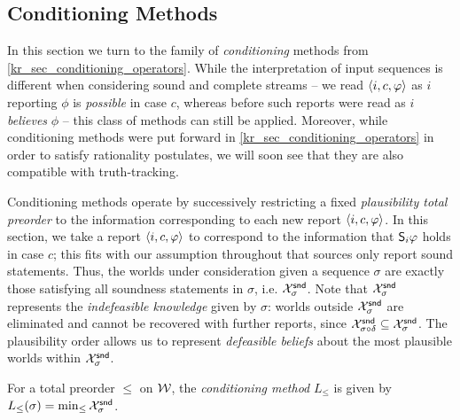 \subsection{Conditioning Methods}
\label{tt_sec_conditioning_methods}

In this section we turn to the family of \emph{conditioning} methods from
\cref{kr_sec_conditioning_operators}.
While the interpretation of input sequences is different when considering sound
and complete streams -- we
read $\tuple{i, c, \phi}$ as $i$ reporting $\phi$ is \emph{possible} in case
$c$, whereas before such reports were read as $i$
\emph{believes} $\phi$ -- this class of methods can still be applied.
Moreover, while conditioning methods were put forward in
\cref{kr_sec_conditioning_operators} in order to satisfy rationality
postulates, we will soon see that they are also compatible with truth-tracking.

Conditioning methods operate by successively restricting a fixed
\emph{plausibility total preorder} to the information corresponding to each
new report $\tuple{i, c, \phi}$. In this section, we take a report $\tuple{i, c,
\phi}$ to correspond to the information that $\S_i\phi$ holds in case $c$; this
fits with our assumption throughout that sources only report sound
statements.\footnotemark{}
%
Thus, the worlds under
consideration given a sequence $\sigma$ are exactly those satisfying all
soundness statements in $\sigma$, i.e. $\Xsnd_\sigma$. Note that $\Xsnd_\sigma$
represents the \emph{indefeasible knowledge} given by $\sigma$: worlds outside
$\Xsnd_\sigma$ are eliminated and cannot be recovered with further reports,
since $\Xsnd_{\sigma \seqappend \delta} \subseteq \Xsnd_\sigma$. The
plausibility order allows us to represent \emph{defeasible beliefs} about the
most plausible worlds within $\Xsnd_\sigma$.


\begin{definition}
    \label{tt_def_conditioning_method}
    For a total preorder $\le$ on $\worlds$, the \emph{conditioning method}
    $L_{\le}$ is given by $L_{\le}(\sigma) = \min_{\le}{\Xsnd_\sigma}$.
\end{definition}

